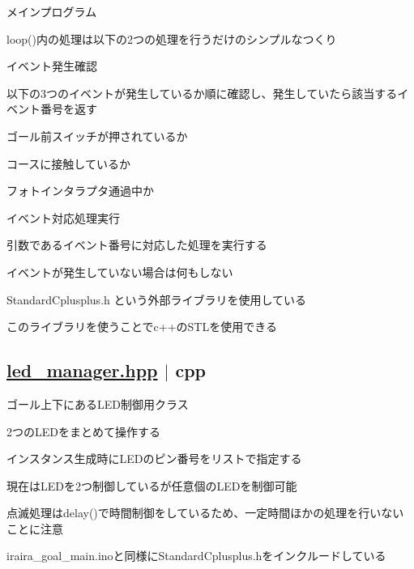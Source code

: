 \begin{DoxyItemize}
\item メインプログラム
\item loop()内の処理は以下の2つの処理を行うだけのシンプルなつくり
\begin{DoxyItemize}
\item イベント発生確認
\begin{DoxyItemize}
\item 以下の3つのイベントが発生しているか順に確認し、発生していたら該当するイベント番号を返す
\begin{DoxyItemize}
\item ゴール前スイッチが押されているか
\item コースに接触しているか
\item フォトインタラプタ通過中か
\end{DoxyItemize}
\end{DoxyItemize}
\item イベント対応処理実行
\begin{DoxyItemize}
\item 引数であるイベント番号に対応した処理を実行する
\item イベントが発生していない場合は何もしない
\end{DoxyItemize}
\end{DoxyItemize}
\item Standard\+Cplusplus.\+h という外部ライブラリを使用している
\begin{DoxyItemize}
\item このライブラリを使うことでc++の\+S\+T\+Lを使用できる
\end{DoxyItemize}
\end{DoxyItemize}

\subsection*{\mbox{\hyperlink{led__manager_8hpp}{led\+\_\+manager.\+hpp}} $\vert$ cpp}


\begin{DoxyItemize}
\item ゴール上下にある\+L\+E\+D制御用クラス
\item 2つの\+L\+E\+Dをまとめて操作する
\item インスタンス生成時に\+L\+E\+Dのピン番号をリストで指定する
\item 現在は\+L\+E\+Dを2つ制御しているが任意個の\+L\+E\+Dを制御可能
\item 点滅処理はdelay()で時間制御をしているため、一定時間ほかの処理を行いないことに注意
\item iraira\+\_\+goal\+\_\+main.\+inoと同様に\+Standard\+Cplusplus.\+hをインクルードしている 
\end{DoxyItemize}